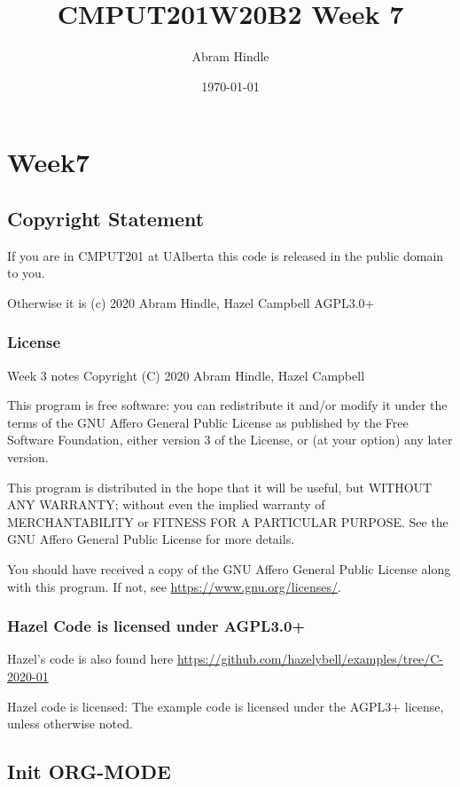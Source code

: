 \documentclass[11pt]{article}
\author{Abram Hindle}
\date{\today}
\title{CMPUT201W20B2 Week 7}
\begin{document}
\maketitle
\tableofcontents


\section{Week7}
\label{sec:org590fb24}
\subsection{Copyright Statement}
\label{sec:org4590e31}

If you are in CMPUT201 at UAlberta this code is released in the public
domain to you.

Otherwise it is (c) 2020 Abram Hindle, Hazel Campbell AGPL3.0+

\subsubsection{License}
\label{sec:org33592e7}

Week 3 notes
Copyright (C) 2020 Abram Hindle, Hazel Campbell

This program is free software: you can redistribute it and/or modify
it under the terms of the GNU Affero General Public License as
published by the Free Software Foundation, either version 3 of the
License, or (at your option) any later version.

This program is distributed in the hope that it will be useful,
but WITHOUT ANY WARRANTY; without even the implied warranty of
MERCHANTABILITY or FITNESS FOR A PARTICULAR PURPOSE.  See the
GNU Affero General Public License for more details.

You should have received a copy of the GNU Affero General Public License
along with this program.  If not, see \url{https://www.gnu.org/licenses/}.


\subsubsection{Hazel Code is licensed under AGPL3.0+}
\label{sec:orge753ce9}

Hazel's code is also found here
\url{https://github.com/hazelybell/examples/tree/C-2020-01}

Hazel code is licensed: The example code is licensed under the AGPL3+
license, unless otherwise noted.

\subsection{Init ORG-MODE}
\label{sec:orge61dc2a}
\end{document}
